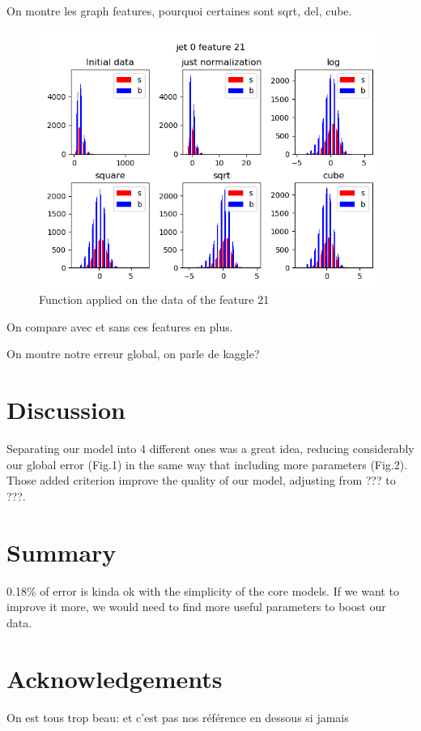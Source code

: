 \documentclass[10pt,conference,compsocconf]{IEEEtran}
\begin{document}
	On montre les graph features, pourquoi certaines sont sqrt, del, cube.
	\begin{figure}[tbp]
		\centering
		\includegraphics[width=\columnwidth]{21_0}
		\caption{Function applied on the data of the feature 21}
		\vspace{-3mm}
		\label{fig:feature21function}
	\end{figure}
	On compare avec et sans ces features en plus.
	
	On montre notre erreur global, on parle de kaggle?
	
	
	
	\section{Discussion}
	
	Separating our model into 4 different ones was a great idea, reducing considerably our global error (Fig.1) in the same way that including more parameters (Fig.2). Those added criterion improve the quality of our model, adjusting from ??? to ???.    
	
	
	
	\section{Summary}
	0.18\% of error is kinda ok with the simplicity of the core models. If we want to improve it more, we would need to find more useful parameters to boost our data.
	
	\section*{Acknowledgements}
	On est tous trop beau: et c'est pas nos r\'ef\'erence en dessous si jamais
	
	
	
	
\end{document}
